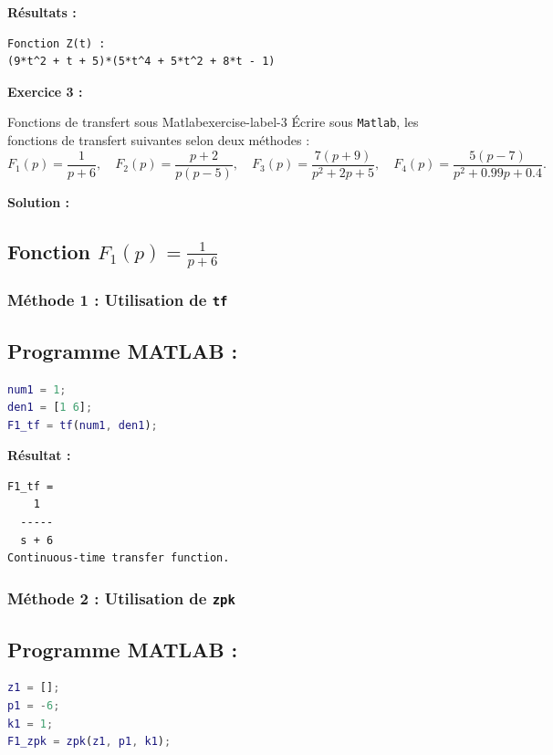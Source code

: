 \documentclass{article}
\begin{document}
\textbf{Résultats :}
\begin{verbatim}
Fonction Z(t) :
(9*t^2 + t + 5)*(5*t^4 + 5*t^2 + 8*t - 1)
\end{verbatim}


\newpage

\textsf{\textbf{Exercice 3 :}}
\begin{problem}{Fonctions de transfert sous Matlab}{exercise-label-3}
\'Ecrire sous \texttt{Matlab}, les fonctions de transfert suivantes selon deux m\'ethodes :
\[
F_1(p) = \frac{1}{p+6}, \quad
F_2(p) = \frac{p+2}{p(p-5)}, \quad
F_3(p) = \frac{7(p+9)}{p^2 + 2p + 5}, \quad
F_4(p) = \frac{5(p-7)}{p^2 + 0.99p + 0.4}.
\]
\end{problem}

\textsf{\textbf{Solution :}}

\subsection*{Fonction $F_1(p) = \frac{1}{p + 6}$}

\subsubsection*{Méthode 1 : Utilisation de \texttt{tf}}
\subsection*{Programme MATLAB :}
\begin{lstlisting}[language=Matlab]
% F1(p) = 1 / (p + 6)
num1 = 1; 
den1 = [1 6]; 
F1_tf = tf(num1, den1);
\end{lstlisting}

\textbf{Résultat :}
\begin{verbatim}
F1_tf =
    1
  -----
  s + 6
Continuous-time transfer function.
\end{verbatim}

\subsubsection*{Méthode 2 : Utilisation de \texttt{zpk}}
\subsection*{Programme MATLAB :}
\begin{lstlisting}[language=Matlab]
% F1(p)
z1 = []; 
p1 = -6; 
k1 = 1;
F1_zpk = zpk(z1, p1, k1);
\end{lstlisting}
\end{document}
